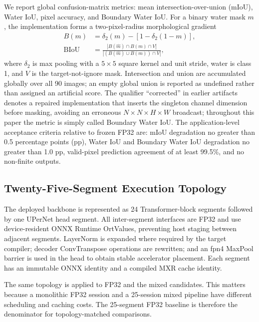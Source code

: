 \documentclass[conference]{IEEEtran}
\begin{document}
We report global confusion-matrix metrics: mean intersection-over-union (mIoU), Water IoU, pixel accuracy, and Boundary Water IoU. For a binary water mask $m$, the implementation forms a two-pixel-radius morphological gradient
\begin{equation}
\begin{aligned}
B(m)&=\delta_{2}(m)-\left[1-\delta_{2}(1-m)\right],\\
\operatorname{BIoU}&=\frac{|B(\hat m)\cap B(m)\cap V|}{|(B(\hat m)\cup B(m))\cap V|},
\end{aligned}
\label{eq:boundary-iou}
\end{equation}
where $\delta_{2}$ is max pooling with a $5\times5$ square kernel and unit stride, water is class 1, and $V$ is the target-not-ignore mask. Intersection and union are accumulated globally over all 90 images; an empty global union is reported as undefined rather than assigned an artificial score. The qualifier ``corrected'' in earlier artifacts denotes a repaired implementation that inserts the singleton channel dimension before masking, avoiding an erroneous $N\times N\times H\times W$ broadcast; throughout this paper the metric is simply called Boundary Water IoU. The application-level acceptance criteria relative to frozen FP32 are: mIoU degradation no greater than 0.5 percentage points (pp), Water IoU and Boundary Water IoU degradation no greater than 1.0 pp, valid-pixel prediction agreement of at least 99.5\%, and no non-finite outputs.

\subsection{Twenty-Five-Segment Execution Topology}

The deployed backbone is represented as 24 Transformer-block segments followed by one UPerNet head segment. All inter-segment interfaces are FP32 and use device-resident ONNX Runtime OrtValues, preventing host staging between adjacent segments. LayerNorm is expanded where required by the target compiler; decoder ConvTranspose operations are rewritten; and an fpn4 MaxPool barrier is used in the head to obtain stable accelerator placement. Each segment has an immutable ONNX identity and a compiled MXR cache identity.

The same topology is applied to FP32 and the mixed candidates. This matters because a monolithic FP32 session and a 25-session mixed pipeline have different scheduling and caching costs. The 25-segment FP32 baseline is therefore the denominator for topology-matched comparisons.
\end{document}
